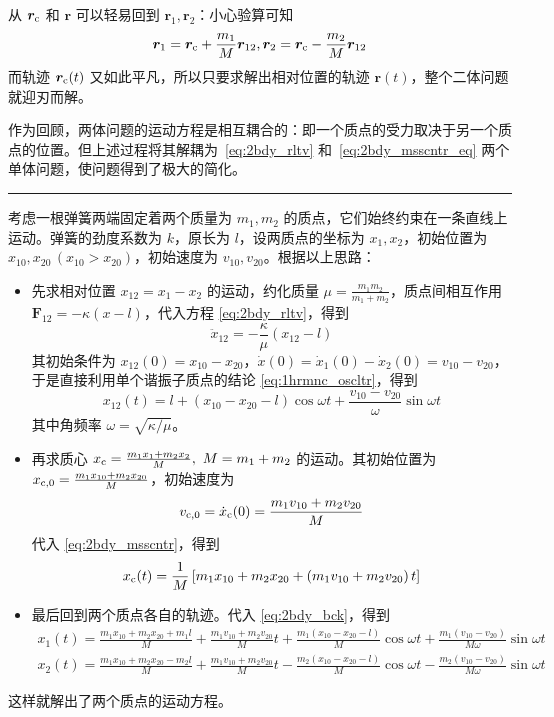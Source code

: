 \documentclass[cn,10pt,math=newtx,citestyle=gb7714-2015,bibstyle=gb7714-2015]{elegantbook}
\def\bm{\boldsymbol}
\def\srule{\noindent\rule{\linewidth}{0.3mm}}
\begin{document}
从 $\bm r_\text c$ 和 $\bm r$ 可以轻易回到 $\bm r_1,\bm r_2$：小心验算可知
\begin{equation}\label{eq:2bdy_bck}
    \bm r_1 = \bm r_\text c+\frac{m_1}{M}\bm r_{12}, \bm r_2 = \bm r_\text c-\frac{m_2}{M}\bm r_{12}
\end{equation}
而轨迹 $\bm r_\text c(t)$ 又如此平凡，所以只要求解出相对位置的轨迹 $\bm r(t)$，整个二体问题就迎刃而解。

作为回顾，两体问题的运动方程是相互耦合的：即一个质点的受力取决于另一个质点的位置。但上述过程将其解耦为~\ref{eq:2bdy_rltv} 和~\ref{eq:2bdy_msscntr_eq} 两个单体问题，使问题得到了极大的简化。

\srule

\begin{instance}[谐振子的约化]
考虑一根弹簧两端固定着两个质量为 $m_1,m_2$ 的质点，它们始终约束在一条直线上运动。弹簧的劲度系数为 $k$，原长为 $l$，设两质点的坐标为 $x_1,x_2$，初始位置为 $x_{10},x_{20}\, (x_{10}>x_{20})$，初始速度为 $v_{10},v_{20}$。根据以上思路：
\begin{itemize}
    \item 先求相对位置 $x_{12}=x_1-x_2$ 的运动，约化质量 $\mu = \frac{m_1m_2}{m_1+m_2}$，质点间相互作用 $\bm F_{12} = -\kappa (x-l)$，代入方程 \ref{eq:2bdy_rltv}，得到
    \begin{equation*}
        \ddot{x}_{12} = -\frac{\kappa}{\mu} (x_{12}-l)
    \end{equation*}
    其初始条件为 $x_{12}(0) = x_{10}-x_{20}$，$\dot{x}(0) = \dot{x}_1(0)-\dot{x}_2(0) = v_{10}-v_{20}$，于是直接利用单个谐振子质点的结论 \ref{eq:1hrmnc_oscltr}，得到
    \begin{equation*}
        x_{12}(t) = l + \left(x_{10}-x_{20}-l\right)\cos\omega t+\frac{v_{10}-v_{20}}{\omega}\sin\omega t
    \end{equation*}
    其中角频率 $\omega=\sqrt{\kappa/\mu}$。
    \item 再求质心 $x_{\text c}=\frac{m_1x_1+m_2x_2}{M},\ M=m_1+m_2$ 的运动。其初始位置为 $x_{\text c,0}=\frac{m_1x_{10}+m_2x_{20}}{M}$，初始速度为
    \begin{equation*}
        v_{\text c,0} = \dot{x}_{\text c}(0) = \frac{m_1v_{10}+m_2v_{20}}{M}
    \end{equation*}
    代入 \ref{eq:2bdy_msscntr}，得到
    \begin{equation*}
        x_{\text c}(t) = \frac{1}{M}\left[m_1x_{10}+m_2x_{20} + \left(m_1v_{10}+m_2v_{20}\right)t\right]
    \end{equation*}
    \item 最后回到两个质点各自的轨迹。代入 \ref{eq:2bdy_bck}，得到
    \begin{gather*}
        x_1(t) = \frac{m_1x_{10}+m_2x_{20}+m_1l}{M}+\frac{m_1v_{10}+m_2v_{20}}{M}t + \frac{m_1(x_{10}-x_{20}-l)}{M}\cos\omega t +\frac{m_1(v_{10}-v_{20})}{M\omega}\sin\omega t\\
        x_2(t) = \frac{m_1x_{10}+m_2x_{20}-m_2l}{M}+\frac{m_1v_{10}+m_2v_{20}}{M}t - \frac{m_2(x_{10}-x_{20}-l)}{M}\cos\omega t -\frac{m_2(v_{10}-v_{20})}{M\omega}\sin\omega t
    \end{gather*}
\end{itemize}
这样就解出了两个质点的运动方程。
\end{instance}
\end{document}
